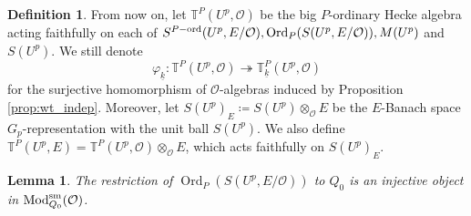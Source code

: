 \documentclass[leqno]{amsart}
\newcommand{\wt}[1]{\underline{ #1 }}
\newcommand{\TT}{\mathbb{T}} %
\DeclareMathOperator{\Mod}{\textnormal{Mod}}
\DeclareMathOperator{\Ord}{Ord}
\newcommand{\sm}{\textnormal{sm}}
\newcommand{\ord}{\textnormal{ord}}
\newcommand{\oo}{\mathcal{O}} %
\newtheorem{lem}[thm]{Lemma}
\theoremstyle{definition}
\newtheorem{defn}[thm]{Definition}
\theoremstyle{remark}
\begin{document}
\begin{defn}\label{def:big_hecke}
	From now on, let $\TT^P(U^p,\oo)$
	be the big $P$-ordinary Hecke algebra 
	acting faithfully on each of 
	$S^{P-\ord}(U^p,E/\oo), \Ord_P(S(U^p,E/\oo)), M(U^p)$
	and $S(U^p)$. 
	We still denote 
	\[
		\varphi_{\wt{k}}\colon \TT^P(U^p,\oo)\twoheadrightarrow
		\TT^P_{\wt{k}}(U^p,\oo)
	\]
	for the surjective homomorphism of $\oo$-algebras
	induced by Proposition \ref{prop:wt_indep}.
	Moreover, 
	let $S(U^p)_E\coloneqq S(U^p)\otimes_{\oo}E$
	be the $E$-Banach space $G_p$-representation with 
	the unit ball $S(U^p)$. 
	We also define $\TT^P(U^p,E)=\TT^P(U^p,\oo)\otimes_{\oo}E$,
	which acts faithfully on $S(U^p)_E$.
\end{defn}


\begin{lem}\label{lem:inj}
	The restriction of
	$\Ord_P(S(U^p,E/\oo))$ to $Q_0$ 
	is an injective object
	in $\Mod^{\sm}_{Q_0}(\oo)$.
\end{lem}
\end{document}
